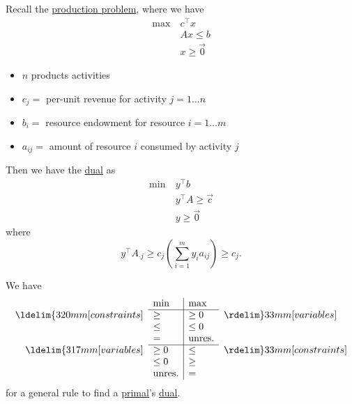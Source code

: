 \begin{prev}
	Recall the \hyperref[subsec:production-problem]{production problem}, where we have
	\[
		\begin{aligned}
			\max~ & c^{\top}x     \\
			      & Ax \leq b     \\
			      & x\geq \vec{0}
		\end{aligned}
	\]
	\begin{itemize}
		\item \(n\) products activities
		\item \(c_{j}=\) per-unit revenue for activity \(j = 1\dots n\)
		\item \(b_{i}=\) resource endowment for resource \(i = 1\dots m\)
		\item \(a_{ij}=\) amount of resource \(i\) consumed by activity \(j\)
	\end{itemize}
	Then we have the \hyperref[def:dual]{dual} as
	\[
		\begin{aligned}
			\min~ & y^{\top}b               \\
			      & y^{\top} A\geq  \vec{c} \\
			      & y\geq \vec{0}
		\end{aligned}
	\]
	where \[
		y^{\top}A_{\cdot j}\geq c_{j} \left( \sum\limits_{i=1}^{m} y_{i}a_{ij} \right) \geq c_{j}.
	\]
\end{prev}

\begin{note}
	We have
	\[
		\begin{array}{rl|ll}

			                                & \min          & \max          &                                \\
			\cline{2-3}
			\ldelim\{{3}{20mm}[constraints] & \geq          & \geq 0        & \rdelim\}{3}{3mm}[variables]   \\
			                                & \leq          & \leq 0        &                                \\
			                                & =             & \mbox{unres.} &                                \\
			\cline{2-3}
			\ldelim\{{3}{17mm}[variables]   & \geq 0        & \leq          & \rdelim\}{3}{3mm}[constraints] \\
			                                & \leq 0        & \geq          &                                \\
			                                & \mbox{unres.} & =             &                                \\
		\end{array}
	\]
	for a general rule to find a \hyperref[def:primal]{primal}'s \hyperref[def:dual]{dual}.
\end{note}


